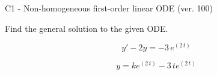 \begin{exercise}
  \begin{exerciseTitle}C1 - Non-homogeneous first-order linear ODE (ver. 100)\end{exerciseTitle}
  \begin{exerciseStatement}
    
Find the general solution to the given ODE.

    
\[y'-2y= -3 \, e^{\left(2 \, t\right)}\]

  \end{exerciseStatement}
  \begin{exerciseAnswer}
    
\[y= k e^{\left(2 \, t\right)} - 3 \, t e^{\left(2 \, t\right)}\]

  \end{exerciseAnswer}
\end{exercise}